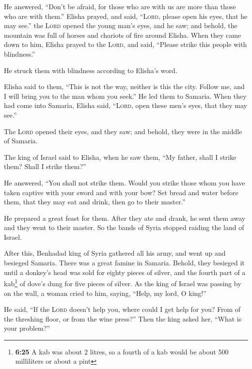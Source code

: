  He answered, ``Don't be afraid, for those who are with
us are more than those who are with them.''  Elisha
prayed, and said, ``\textsc{Lord}, please open his eyes, that he may
see.'' the \textsc{Lord} opened the young man's eyes, and he saw; and
behold, the mountain was full of horses and chariots of fire around
Elisha.  When they came down to him, Elisha prayed to the
\textsc{Lord}, and said, ``Please strike this people with blindness.''

He struck them with blindness according to Elisha's word.

 Elisha said to them, ``This is not the way, neither is
this the city. Follow me, and I will bring you to the man whom you
seek.'' He led them to Samaria.  When they had come into
Samaria, Elisha said, ``\textsc{Lord}, open these men's eyes, that they
may see.''

The \textsc{Lord} opened their eyes, and they saw; and behold, they were
in the middle of Samaria.

 The king of Israel said to Elisha, when he saw them,
``My father, shall I strike them? Shall I strike them?''

 He answered, ``You shall not strike them. Would you
strike those whom you have taken captive with your sword and with your
bow? Set bread and water before them, that they may eat and drink, then
go to their master.''

 He prepared a great feast for them. After they ate and
drank, he sent them away and they went to their master. So the bands of
Syria stopped raiding the land of Israel.

 After this, Benhadad king of Syria gathered all his
army, and went up and besieged Samaria.  There was a
great famine in Samaria. Behold, they besieged it until a donkey's head
was sold for eighty pieces of silver, and the fourth part of a
kab\footnote{\textbf{6:25} A kab was about 2 litres, so a fourth of a
  kab would be about 500 milliliters or about a pint} of dove's dung for
five pieces of silver.  As the king of Israel was passing
by on the wall, a woman cried to him, saying, ``Help, my lord, O king!''

 He said, ``If the \textsc{Lord} doesn't help you, where
could I get help for you? From of the threshing floor, or from the wine
press?''  Then the king asked her, ``What is your
problem?''

